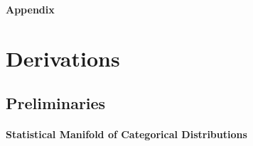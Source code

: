 \appendix
\onecolumn

\vspace{0.5in}
\begin{center}{\bf {\LARGE Appendix}}\end{center}












\section{Derivations \label{app:derivation}}

\subsection{Preliminaries} \label{app:derivation:prelim}

\paragraph{Statistical Manifold of Categorical Distributions}

